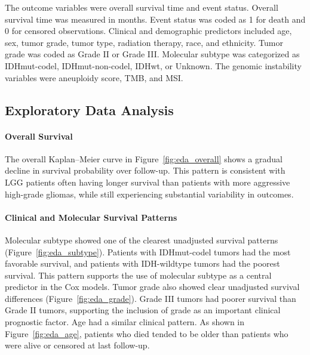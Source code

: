 \documentclass[paper=a4, fontsize=11pt]{scrartcl}
\numberwithin{equation}{section}		%
\numberwithin{figure}{section}			%
\numberwithin{table}{section}				%
\begin{document}
\noindent
The outcome variables were overall survival time and event status. Overall survival time was measured in months. Event status was coded as 1 for death and 0 for censored observations. Clinical and demographic predictors included age, sex, tumor grade, tumor type, radiation therapy, race, and ethnicity. Tumor grade was coded as Grade II or Grade III. Molecular subtype was categorized as IDHmut-codel, IDHmut-non-codel, IDHwt, or Unknown. The genomic instability variables were aneuploidy score, TMB, and MSI. 

\subsection{Exploratory Data Analysis} 

\paragraph{Overall Survival} The overall Kaplan--Meier curve in Figure~\ref{fig:eda_overall} shows a gradual decline in survival probability over follow-up. This pattern is consistent with LGG patients often having longer survival than patients with more aggressive high-grade gliomas, while still experiencing substantial variability in outcomes. 

\paragraph{Clinical and Molecular Survival Patterns} Molecular subtype showed one of the clearest unadjusted survival patterns (Figure~\ref{fig:eda_subtype}). Patients with IDHmut-codel tumors had the most favorable survival, and patients with IDH-wildtype tumors had the poorest survival. This pattern supports the use of molecular subtype as a central predictor in the Cox models. Tumor grade also showed clear unadjusted survival differences (Figure~\ref{fig:eda_grade}). Grade III tumors had poorer survival than Grade II tumors, supporting the inclusion of grade as an important clinical prognostic factor. Age had a similar clinical pattern. As shown in Figure~\ref{fig:eda_age}, patients who died tended to be older than patients who were alive or censored at last follow-up. 
\end{document}

